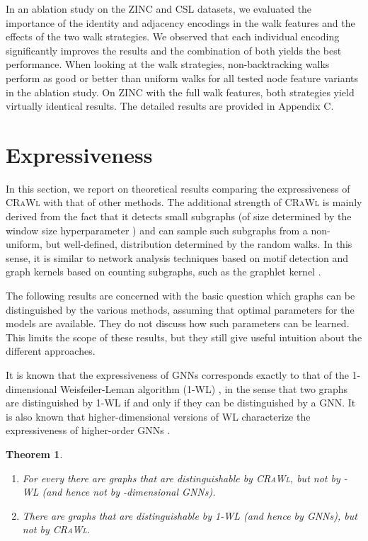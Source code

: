 \documentclass{scrartcl} \usepackage[dvipsnames]{xcolor}
\newcommand{\crawl}{\textsc{CRaWl}}
\begin{document}
In an ablation study on the ZINC and CSL datasets, we evaluated the importance of the identity and adjacency encodings in the walk features and the effects of the two walk strategies.
We observed that each individual encoding significantly improves the results and the combination of both yields the best performance.
When looking at the walk strategies, non-backtracking walks perform as good or better than uniform walks for all tested node feature variants in the ablation study.
On ZINC with the full walk features, both strategies yield virtually identical results.
The detailed results are provided in Appendix C.

     \section{Expressiveness}
\label{sec:expressiveness}

In this section, we report on theoretical results
comparing the expressiveness of \crawl{} with that of other
methods. The additional strength of \crawl{} is mainly derived from the fact
that it detects small subgraphs (of size determined by the window size
hyperparameter ) and can sample such subgraphs from a non-uniform, but
well-defined, distribution determined by the random walks. In this
sense, it is similar to network analysis techniques based on motif
detection \cite{alo07} and graph kernels based on counting subgraphs, such as the graphlet kernel \cite{shevispet+09}.

The following results are concerned with the basic question which graphs
can be distinguished by the various methods, assuming that optimal
parameters for the models are available. They do not discuss how such
parameters can be learned. This limits the scope of these results,
but they still give useful intuition about the different approaches.



It is known that the expressiveness of GNNs corresponds exactly to
that of the 1-dimensional Weisfeiler-Leman algorithm (1-WL)
\cite{MorrisAAAI19,Keyulu18}, in the sense that two graphs are
distinguished by 1-WL if and only if they can be distinguished by a
GNN. 
It is also known that higher-dimensional versions of WL characterize the expressiveness of higher-order GNNs \cite{MorrisAAAI19}.


\newtheorem{theorem}{Theorem}

\begin{theorem}\label{theo:1}
 \hphantom\\
  \begin{enumerate}
  \item For every  there are graphs that are distinguishable
    by \crawl{}, but not
    by -WL (and hence not by -dimensional GNNs).
  \item There are graphs that are distinguishable by 1-WL (and hence
    by GNNs), but not by \crawl{}.
  \end{enumerate}
\end{theorem}
\end{document}
